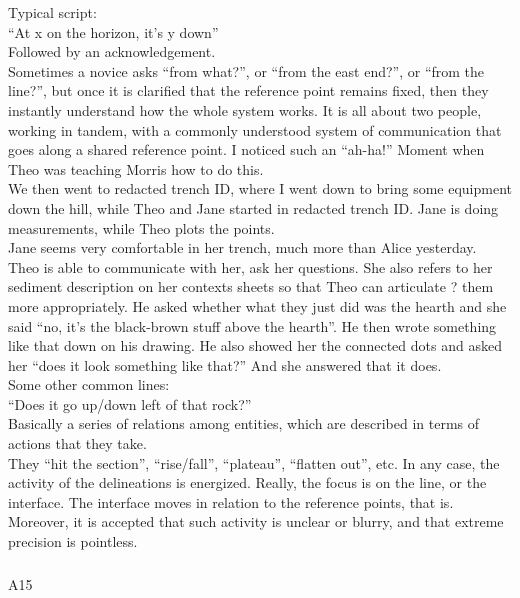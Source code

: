 \documentclass[
]{article}
\makeatletter
\let\oldsubparagraph\subparagraph
\renewcommand{\subparagraph}{
    \@ifstar
      \xxxSubParagraphStar
      \xxxSubParagraphNoStar
  }
\newcommand{\xxxSubParagraphStar}[1]{\oldsubparagraph*{#1}\mbox{}}
\newcommand{\xxxSubParagraphNoStar}[1]{\oldsubparagraph{#1}\mbox{}}
\makeatother
\begin{document}
Typical script:\\
``At x on the horizon, it's y down''\\
Followed by an acknowledgement.\\
Sometimes a novice asks ``from what?'', or ``from the east end?'', or
``from the line?'', but once it is clarified that the reference point
remains fixed, then they instantly understand how the whole system
works. It is all about two people, working in tandem, with a commonly
understood system of communication that goes along a shared reference
point. I noticed such an ``ah-ha!'' Moment when Theo was teaching Morris
how to do this.\\
We then went to redacted trench ID, where I went down to bring some
equipment down the hill, while Theo and Jane started in redacted trench
ID. Jane is doing measurements, while Theo plots the points.\\
Jane seems very comfortable in her trench, much more than Alice
yesterday.\\
Theo is able to communicate with her, ask her questions. She also refers
to her sediment description on her contexts sheets so that Theo can
articulate ? them more appropriately. He asked whether what they just
did was the hearth and she said ``no, it's the black-brown stuff above
the hearth''. He then wrote something like that down on his drawing. He
also showed her the connected dots and asked her ``does it look
something like that?'' And she answered that it does.\\
Some other common lines:\\
``Does it go up/down left of that rock?''\\
Basically a series of relations among entities, which are described in
terms of actions that they take.\\
They ``hit the section'', ``rise/fall'', ``plateau'', ``flatten out'',
etc. In any case, the activity of the delineations is energized. Really,
the focus is on the line, or the interface. The interface moves in
relation to the reference points, that is. Moreover, it is accepted that
such activity is unclear or blurry, and that extreme precision is
pointless.

\subparagraph{A15}\label{sec-A15}
\end{document}
